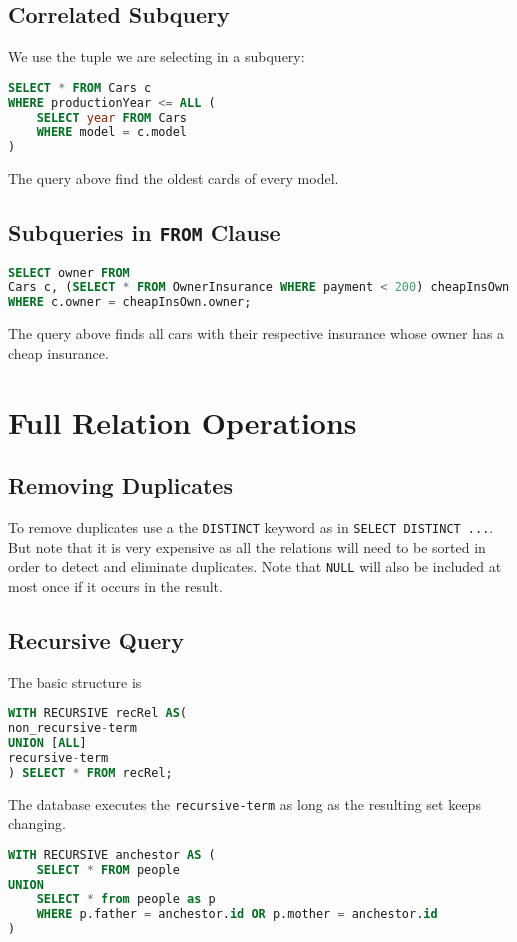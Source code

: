 \documentclass{sciposter}
\renewcommand{\t}[1]{\texttt{#1}}
\begin{document}
\begin{multicols}{3}
\subsection*{Correlated Subquery}

We use the tuple we are selecting in a subquery:

\begin{lstlisting}[language=SQL]
SELECT * FROM Cars c
WHERE productionYear <= ALL (
	SELECT year FROM Cars 
	WHERE model = c.model
) 
\end{lstlisting}

The query above find the oldest cards of every model.


\subsection*{Subqueries in \t{FROM} Clause}

\begin{lstlisting}[language=SQL]
SELECT owner FROM
Cars c, (SELECT * FROM OwnerInsurance WHERE payment < 200) cheapInsOwn
WHERE c.owner = cheapInsOwn.owner;
\end{lstlisting}
The query above finds all cars with their respective insurance whose owner has a cheap insurance.

\section*{Full Relation Operations}

\subsection*{Removing Duplicates}

To remove duplicates use a the  \t{DISTINCT} keyword as in \t{SELECT DISTINCT ...}. But note that it is very expensive as all the relations will need to be sorted in order to detect and eliminate duplicates. Note that \t{NULL} will also be included at most once if it occurs in the result.


\subsection*{Recursive Query}
The basic structure is 
\begin{lstlisting}[language=SQL]
WITH RECURSIVE recRel AS(
non_recursive-term
UNION [ALL]
recursive-term
) SELECT * FROM recRel;
\end{lstlisting}
The database executes the \t{recursive-term} as long as the resulting set keeps changing.
\begin{lstlisting}[language=SQL]
WITH RECURSIVE anchestor AS (
	SELECT * FROM people
UNION
	SELECT * from people as p
	WHERE p.father = anchestor.id OR p.mother = anchestor.id
)


\end{lstlisting}
\end{multicols}
\end{document}
